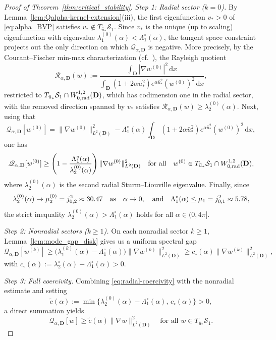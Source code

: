 \documentclass[reqno,11pt]{amsart}
\theoremstyle{definition}
\newcommand{\ud}{\,\mathrm{d}}
\begin{document}
\begin{proof}[Proof of Theorem~\ref{thm:critical_stability}]
\noindent\textit{Step 1: Radial sector ($k=0$).}
By Lemma~\ref{lem:Qalpha-kernel-extension}\textup{(iii)}, the first eigenfunction $v_*>0$ of \eqref{eq:alpha_BVP} satisfies $v_*\notin T_{\bar u_*}\mathcal{S}_1$.
Since $v_*$ is the unique (up to scaling) eigenfunction with eigenvalue $\lambda_1^{(0)}(\alpha)<\Lambda_1^\circ(\alpha)$,
the tangent space constraint projects out the only direction on which $\mathscr{Q}_{\alpha,\mathbf{D}}$ is negative.
More precisely, by the Courant--Fischer min-max characterization (cf.\ \cite[Chapter~VI]{CourantHilbert}),
the Rayleigh quotient
\[
\mathcal{R}_{\alpha,\mathbf{D}}(w):=\frac{\int_{\mathbf{D}}|\nabla w^{(0)}|^2\ud x}{\int_{\mathbf{D}}(1+2\alpha\bar u_*^2)e^{\alpha\bar u_*^2}(w^{(0)})^2\ud x},
\]
restricted to $T_{\bar u_*}\mathcal{S}_1\cap W^{1,2}_{0,{\rm rad}}(\mathbf{D})$, which has codimension one in the radial sector, with the removed direction spanned by $v_*$ satisfies 
$\mathcal{R}_{\alpha,\mathbf{D}}(w)\geq\lambda_2^{(0)}(\alpha)$.  Next, using that 
\[
\mathscr{Q}_{\alpha,\mathbf{D}}[w^{(0)}]=\|\nabla w^{(0)}\|_{L^2(\mathbf{D})}^2-\Lambda_1^\circ(\alpha)\int_{\mathbf{D}}(1+2\alpha\bar u_*^2)e^{\alpha\bar u_*^2}(w^{(0)})^2\ud x,
\]
one has
\begin{equation}\label{eq:radial-coercivity}
\mathscr{Q}_{\alpha,\mathbf{D}}[w^{(0)}]\ge \left(1-\frac{\Lambda_1^\circ(\alpha)}{\lambda_2^{(0)}(\alpha)}\right)\|\nabla w^{(0)}\|_{L^2(\mathbf{D})}^2
\quad\text{for all} \quad w^{(0)}\in T_{\bar u_*}\mathcal{S}_1\cap W^{1,2}_{0,{\rm rad}}(\mathbf{D}),
\end{equation}
where $\lambda_2^{(0)}(\alpha)$ is the second radial Sturm--Liouville eigenvalue.
Finally, since 
\[
\lambda_2^{(0)}(\alpha)\to\mu_2^{(0)}=j_{0,2}^2\approx 30.47 \quad {\rm as} \quad \alpha\to0, \quad {\rm and} \quad \Lambda_1^\circ(\alpha)\le\mu_1=j_{0,1}^2\approx 5.78,
\]
the strict inequality $\lambda_2^{(0)}(\alpha)>\Lambda_1^\circ(\alpha)$ holds for all $\alpha\in(0,4\pi]$.

\noindent\textit{Step 2: Nonradial sectors ($k\ge 1$).}
On each nonradial sector $k\ge1$, Lemma~\ref{lem:mode_gap_disk} gives us a uniform spectral gap
\[
\mathscr{Q}_{\alpha,\mathbf{D}}[w^{(k)}]
 \ge \big(\lambda_1^{(k)}(\alpha)-\Lambda_1^\circ(\alpha)\big)\| \nabla w^{(k)}\|_{L^2(\mathbf{D})}^2
\ge c_\circ(\alpha)\|\nabla w^{(k)}\|_{L^2(\mathbf{D})}^2,
\]
with $c_\circ(\alpha):=\lambda_2^\circ(\alpha)-\Lambda_1^\circ(\alpha)>0$.

\noindent\textit{Step 3: Full coercivity.}
Combining \eqref{eq:radial-coercivity} with the nonradial estimate and setting
\[
\tilde c(\alpha):=\min\big\{\lambda_2^{(0)}(\alpha)-\Lambda_1^\circ(\alpha),\,c_\circ(\alpha)\big\}>0,
\]
a direct summation yields
\begin{equation}\label{eq:coercivity-disk}
\mathscr{Q}_{\alpha,\mathbf{D}}[w]\ge \tilde c(\alpha)\|\nabla w\|_{L^2(\mathbf{D})}^2
\quad\text{for all }w\in T_{\bar u_*}\mathcal{S}_1.
\end{equation}


\end{proof}
\end{document}
